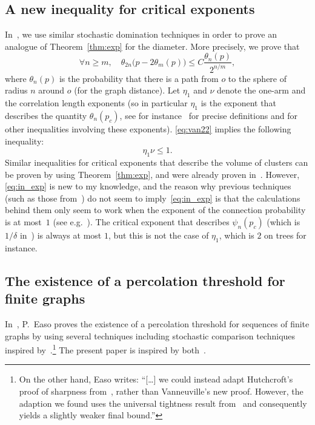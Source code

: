 \documentclass[AHL,Unicode,longabstracts,published]{cedram}
\let\oldforall\forall
\renewcommand*{\forall}{\mathrel{\oldforall}}
\begin{document}
\subsection{A new inequality for critical exponents} In~\cite{Van22}, we use similar stochastic domination techniques in order to prove an analogue of Theorem~\ref{thm:exp} for the diameter. More precisely, we prove that
\begin{equation}\label{eq:van22}
\forall n \ge m, \quad \theta_{2n}\big(p-2\theta_m(p) \big) \le C \frac{\theta_n(p)}{2^{n/m}},
\end{equation}
where $\theta_n(p)$ is the probability that there is a path from $o$ to the sphere of radius $n$ around $o$ (for the graph distance). Let $\eta_1$ and $\nu$ denote the one-arm and the correlation length exponents (so in particular $\eta_1$ is the exponent that describes the quantity $\theta_n(p_c)$, see for instance~\cite{DM21} for precise definitions and for other inequalities involving these exponents). \eqref{eq:van22} implies the following inequality:
\begin{equation}\label{eq:in_exp}
\eta_1 \nu \le 1.
\end{equation}
Similar inequalities for critical exponents that describe the volume of clusters can be proven by using Theorem~\ref{thm:exp}, and were already proven in~\cite{Hut20}. However, \eqref{eq:in_exp} is new to my knowledge, and the reason why previous techniques (such as those from~\cite{Hut20}) do not seem to imply~\eqref{eq:in_exp} is that the calculations behind them only seem to work when the exponent of the connection probability is at most~$1$ (see e.g.~\cite[Section~4.1]{Hut20}). The critical exponent that describes $\psi_n(p_c)$ (which is $1/\delta$ in~\cite{Hut20}) is always at most $1$, but this is not the case of $\eta_1$, which is $2$ on trees for instance.

\subsection{The existence of a percolation threshold for finite graphs} 

In~\cite{Eas22}, P.~Easo proves the existence of a percolation threshold for sequences of finite graphs by using several techniques including stochastic comparison techniques inspired by~\cite{Van22}.\footnote{On the other hand, Easo writes: ``[\dots] we could instead adapt Hutchcroft’s proof of sharpness from~\cite{Hut20}, rather than Vanneuville’s new proof. However, the adaption we found uses the universal tightness result from~\cite{Hut21} and consequently yields a slightly weaker final bound.''} The present paper is inspired by both~\cite{Eas22,Van22}.
\end{document}
